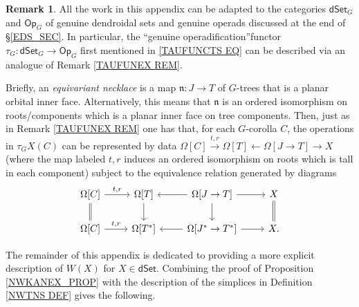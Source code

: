 \documentclass[a4paper,10pt
,draft
]{article}%
\numberwithin{equation}{section}
\numberwithin{figure}{section}
\theoremstyle{definition} %
\newtheorem{remark}[equation]{Remark}%
\newcommand{\1}{\ensuremath{\mathbbm 1}}%
\begin{document}
\begin{remark}\label{GTAUFUNEX REM}
	All the work in this appendix can be adapted to the categories
	$\mathsf{dSet}_G$ and $\mathsf{Op}_G$
	of genuine dendroidal sets and genuine operads
	discussed at the end of \S \ref{EDS_SEC}.
%	
	In particular, 
	the ``genuine operadification''functor
	$\tau_G \colon \mathsf{dSet}_G \to \mathsf{Op}_G$
	first mentioned in
	\eqref{TAUFUNCTS EQ}
	can be described via an analogue of
	Remark \ref{TAUFUNEX REM}.
	
Briefly,
an \emph{equivariant necklace}
is a map $\mathfrak{n} \colon J \to T$ of $G$-trees
that is a planar orbital inner face.
Alternatively, this means that $\mathfrak{n}$
is an ordered isomorphism on roots/components which is a planar inner face on tree components. 
%
Then, just as in Remark \ref{TAUFUNEX REM}
one has that, for each $G$-corolla $C$,
the operations in 
$\tau_G X(C)$
can be represented by data
$\Omega[C] \xrightarrow{t,r}
\Omega[T] \leftarrow
\Omega[J \to T] \to 
X$
(where the map labeled $t,r$ induces an ordered isomorphism on roots which is tall in each component)
subject to the equivalence relation generated by diagrams
\[
\begin{tikzcd}
\Omega[C] \ar{r}{t,r} \ar[equal]{d} &
\Omega[T] \ar{d} &
\Omega[J \to T] \ar{l} \ar{r} \ar{d} &
X \ar[equal]{d}
\\
\Omega[C] \ar{r}{t,r} &
\Omega[T^{\**}] &
\Omega[J^{\**} \to T^{\**}] \ar{l} \ar{r} &
X.
\end{tikzcd}
\]

\end{remark}




The remainder of this appendix is dedicated to providing a more explicit description of $W(X)$ for $X \in \mathsf{dSet}$.
%
Combining the proof of Proposition \ref{NWKANEX_PROP}
with the description of the simplices 
in Definition \ref{NWTNS DEF} gives the following.
\end{document}
